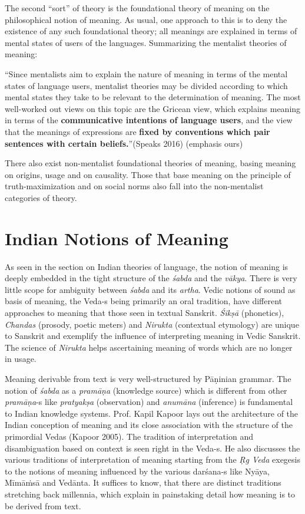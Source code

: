 The second “sort” of theory is the foundational theory of meaning on the philosophical notion of meaning. As usual, one approach to this is to deny the existence of any such foundational theory; all meanings are explained in terms of mental states of users of the languages. Summarizing the mentalist theories of meaning:

\begin{myquote}
“Since mentalists aim to explain the nature of meaning in terms of the mental states of language users, mentalist theories may be divided according to which mental states they take to be relevant to the determination of meaning. The most well-worked out views on this topic are the Gricean view, which explains meaning in terms of the \textbf{communicative intentions of language users}, and the view that the meanings of expressions are \textbf{fixed by conventions which pair sentences with certain beliefs.}”\hfill (Speaks 2016) (emphasis ours)
\end{myquote}

There also exist non-mentalist foundational theories of meaning, basing meaning on origins, usage and on causality. Those that base meaning on the principle of truth-maximization and on social norms also fall into the non-mentalist categories of theory.


\section*{Indian Notions of Meaning}

\vskip -5pt

As seen in the section on Indian theories of language, the notion of meaning is deeply embedded in the tight structure of the \textit{śabda} and the \textit{vākya}. There is very little scope for ambiguity between \textit{śabda} and its \textit{artha}. Vedic notions of sound as basis of meaning, the Veda-s being primarily an oral tradition, have different approaches to meaning that those seen in textual Sanskrit. \textit{Śikṣā} (phonetics), \textit{Chandas} (prosody, poetic meters) and \textit{Nirukta} (contextual etymology) are unique to Sanskrit and exemplify the influence of interpreting meaning in Vedic Sanskrit. The science of \textit{Nirukta} helps ascertaining meaning of words which are no longer in usage.

Meaning derivable from text is very well-structured by Pāṇinian grammar. The notion of \textit{śabda} as a \textit{pramāṇa} (knowledge source) which is different from other \textit{pramāṇa}-s like \textit{pratyakṣa} (observation) and \textit{anumāna} (inference) is fundamental to Indian knowledge systems. Prof. Kapil Kapoor lays out the architecture of the Indian conception of meaning and its close association with the structure of the primordial Vedas (Kapoor 2005). The tradition of interpretation and disambiguation based on context is seen right in the Veda-s. He also discusses the various traditions of interpretation of meaning starting from the \textit{Ṛg Veda} exegesis to the notions of meaning influenced by the various darśana-s like Nyāya, Mīmāṁsā and Vedānta. It suffices to know, that there are distinct traditions stretching back millennia, which explain in painstaking detail how meaning is to be derived from text.

